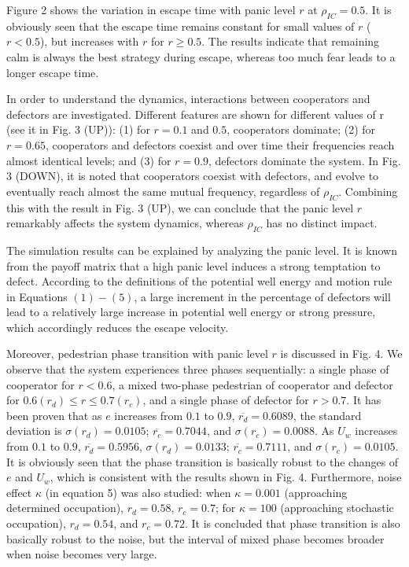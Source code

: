\documentclass[%
 reprint,
 amsmath,amssymb,
 aps,
]{revtex4-1}
\begin{document}
Figure 2 shows the variation in escape time with panic level $r$ at $\rho_{IC}=0.5$. It is obviously seen that the escape time remains constant for small values of $r$ ($r < 0.5$), but increases with $r$ for $r\geq 0.5$. The results indicate that remaining calm is always the best strategy during escape, whereas too much fear leads to a longer escape time.

In order to understand the dynamics, interactions between cooperators and defectors are investigated. Different features are shown for different values of r (see it in Fig. 3 (UP)): (1) for $r = 0.1$ and $0.5$, cooperators dominate; (2) for $r = 0.65$, cooperators and defectors coexist and over time their frequencies reach almost identical levels; and (3) for $r = 0.9$, defectors dominate the system. In Fig. 3 (DOWN), it is noted that cooperators coexist with defectors, and evolve to eventually reach almost the same mutual frequency, regardless of $\rho_{IC}$. Combining this with the result in Fig. 3 (UP), we can conclude that the panic level $r$ remarkably affects the system dynamics, whereas $\rho_{IC}$ has no distinct impact.

The simulation results can be explained by analyzing the panic level. It is known from the payoff matrix that a high panic level induces a strong temptation to defect. According to the definitions of the potential well energy and motion rule in Equations $(1)-(5)$, a large increment in the percentage of defectors will lead to a relatively large increase in potential well energy or strong pressure, which accordingly reduces the escape velocity.


Moreover, pedestrian phase transition with panic level $r$ is discussed in Fig. 4. We observe that the system experiences three phases sequentially: a single phase of cooperator for $r < 0.6$, a mixed two-phase pedestrian of cooperator and defector for \textbf{$0.6(r_{d}) \leq r \leq 0.7(r_{c})$}, and a single phase of defector for $r > 0.7$. It has been proven that as $e$ increases from $0.1$ to $0.9$, $\overline{r_{d}}=0.6089$, the standard deviation is $\sigma(r_{d})=0.0105$; $\overline{r_{c}}=0.7044$, and $\sigma(r_{c})=0.0088$. As $U_{w}$ increases from $0.1$ to $0.9$, $\overline{r_{d}}=0.5956$, $\sigma(r_{d})=0.0133$; $\overline{r_{c}}=0.7111$, and $\sigma(r_{c})=0.0105$. It is obviously seen that the phase transition is basically robust to the changes of $e$ and $U_{w}$, which is consistent with the results shown in Fig. 4. Furthermore, noise effect $\kappa$ (in equation 5) was also studied: when $\kappa=0.001$ (approaching determined occupation), $r_{d}=0.58$, $r_{c}=0.7$; for $\kappa=100$ (approaching stochastic occupation), $r_{d}=0.54$, and $r_{c}=0.72$. It is concluded that phase transition is also basically robust to the noise, but the interval of mixed phase becomes broader when noise becomes very large.
\end{document}
